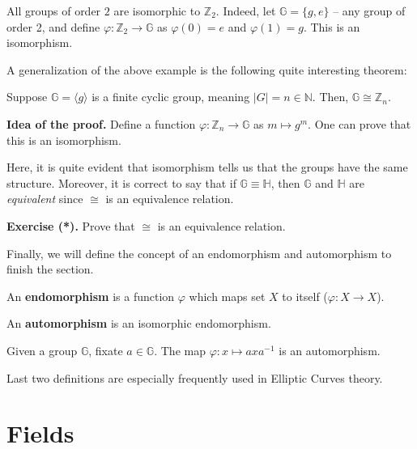 \documentclass[../lecture-notes.tex]{subfiles}
\begin{document}
\begin{example}
    All groups of order $2$ are isomorphic to $\mathbb{Z}_2$. Indeed, let $\mathbb{G} = \{g,e\}$ -- any group of order 2, and define $\varphi: \mathbb{Z}_2 \to \mathbb{G}$ as $\varphi(0) = e$ and $\varphi(1) = g$. This is an isomorphism.
\end{example}

A generalization of the above example is the following quite interesting theorem:

\begin{theorem}
    Suppose $\mathbb{G} = \langle g \rangle$ is a finite cyclic group, meaning $|G| = n \in \mathbb{N}$. Then, $\mathbb{G} \cong \mathbb{Z}_n$.
\end{theorem}

\textbf{Idea of the proof.} Define a function $\varphi: \mathbb{Z}_n \to \mathbb{G}$ as $m \mapsto g^m$. One can prove that this is an isomorphism.

Here, it is quite evident that isomorphism tells us that the groups have the same structure. Moreover, it is correct to say that if $\mathbb{G} \equiv \mathbb{H}$, then $\mathbb{G}$ and $\mathbb{H}$ are \textit{equivalent} since $\cong$ is an equivalence relation.

\textbf{Exercise (*).} Prove that $\cong$ is an equivalence relation.

Finally, we will define the concept of an endomorphism and automorphism to finish the section.

\begin{definition}
    An \textbf{endomorphism} is a function $\varphi$ which maps set $X$ to itself ($\varphi: X \to X$).
\end{definition}

\begin{definition}
    An \textbf{automorphism} is an isomorphic endomorphism.
\end{definition}

\begin{example}
    Given a group $\mathbb{G}$, fixate $a \in \mathbb{G}$. The map $\varphi: x \mapsto axa^{-1}$ is an automorphism.
\end{example}

Last two definitions are especially frequently used in Elliptic Curves theory.

\section{Fields}
\end{document}
